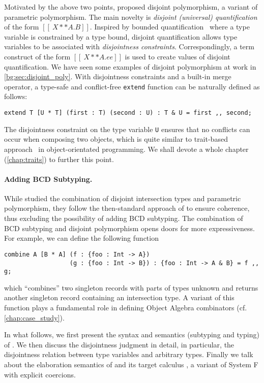 Motivated by the above two points, \citet{alpuimdisjoint} proposed disjoint
polymorphism, a variant of parametric polymorphism. The main novelty is
\textit{disjoint (universal) quantification} of the form $[[ \ X ** A . B ]]$.
Inspired by bounded quantification~\citep{cardelli1994extension} where a type
variable is constrained by a type bound, disjoint quantification allows type
variables to be associated with \textit{disjointness constraints}.
Correspondingly, a term construct of the form $[[ \ X ** A. ee ]]$ is used to
create values of disjoint quantification. We have seen some examples of disjoint
polymorphism at work in \cref{bg:sec:disjoint_poly}. With disjointness constraints
and a built-in merge operator, a type-safe and conflict-free \lstinline{extend}
function can be naturally defined as follows:
\begin{lstlisting}
extend T [U * T] (first : T) (second : U) : T & U = first ,, second;
\end{lstlisting}
The disjointness constraint on the type variable \lstinline{U} ensures that no
conflicts can occur when composing two objects, which is quite similar to
trait-based approach~\citep{scharli2003traits} in object-orientated programming.
We shall devote a whole chapter (\cref{chap:traits}) to further this point.


\paragraph{Adding BCD Subtyping.}

While \citet{alpuimdisjoint} studied the combination of disjoint intersection
types and parametric polymorphism, they follow the then-standard approach
of \citet{oliveira2016disjoint} to ensure coherence, thus excluding the
possibility of adding BCD subtyping. The combination of BCD subtyping and
disjoint polymorphism opens doors for more expressiveness. For example, we can
define the following function
\begin{lstlisting}
combine A [B * A] (f : {foo : Int -> A})
                  (g : {foo : Int -> B}) : {foo : Int -> A & B} = f ,, g;
\end{lstlisting}
which ``combines'' two singleton records with parts of types unknown and returns
another singleton record containing an intersection type. A variant of this
function plays a fundamental role in defining Object Algebra combinators (cf.
\cref{chap:case_study}).




In what follows, we first present the syntax and semantics (subtyping and
typing) of \fnamee. We then discuss the disjointness judgment in detail, in
particular, the disjointness relation between type variables and arbitrary
types. Finally we talk about the elaboration semantics of \fnamee and its target
calculus \tnamee, a variant of System F with explicit coercions.



